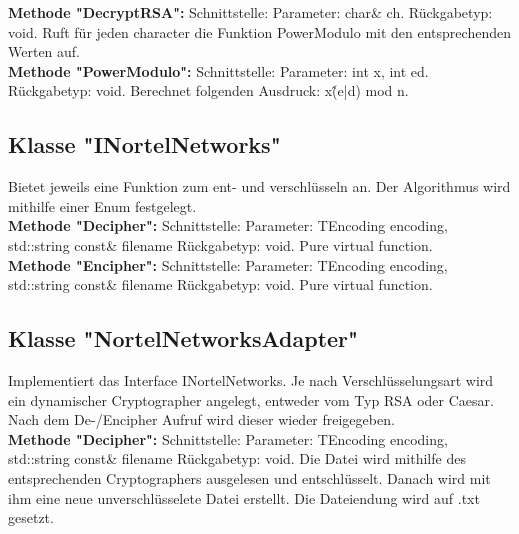 \documentclass[12pt,a4paper]{article}
\begin{document}
\textbf {Methode "DecryptRSA": } 
\newline
Schnittstelle: 
\newline
Parameter: char\& ch.
\newline
Rückgabetyp: void.
\newline
Ruft für jeden character die Funktion PowerModulo mit den entsprechenden Werten auf.
\\

\textbf {Methode "PowerModulo": } 
\newline
Schnittstelle: 
\newline
Parameter: int x, int ed.
\newline
Rückgabetyp: void.
\newline
Berechnet folgenden Ausdruck: x\^(e|d) mod n.
\\


\subsection {Klasse "INortelNetworks"}
Bietet jeweils eine Funktion zum ent- und verschlüsseln an. Der Algorithmus wird mithilfe einer Enum festgelegt.
\\

\textbf {Methode "Decipher": } 
\newline
Schnittstelle:
Parameter: TEncoding encoding, std::string const\& filename
Rückgabetyp: void.
\newline
Pure virtual function.
\\

\textbf {Methode "Encipher": } 
\newline
Schnittstelle:
Parameter: TEncoding encoding, std::string const\& filename
Rückgabetyp: void.
\newline
Pure virtual function.
\\


\subsection {Klasse "NortelNetworksAdapter"}
Implementiert das Interface INortelNetworks. Je nach Verschlüsselungsart wird ein dynamischer Cryptographer angelegt, entweder vom Typ RSA oder Caesar. Nach dem De-/Encipher Aufruf wird dieser wieder freigegeben.
\\

\textbf {Methode "Decipher": } 
\newline
Schnittstelle:
Parameter: TEncoding encoding, std::string const\& filename
Rückgabetyp: void.
\newline
Die Datei wird mithilfe des entsprechenden Cryptographers ausgelesen und entschlüsselt. Danach wird mit ihm eine neue unverschlüsselete Datei erstellt. Die Dateiendung wird auf .txt gesetzt.
\\
\end{document}
